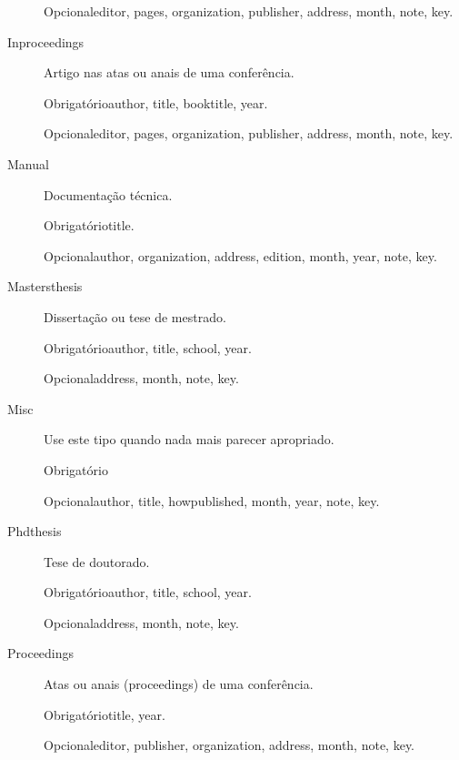 \documentclass[article,openany]{memoir}
\newcommand{\obrigatorios}{%
   \par Obrigatório\dotfill\ignorespaces}
\newcommand{\opcionais}{
   \par Opcional\dotfill\ignorespaces}
\begin{document}
\begin{description}
  \opcionais editor, pages, organization, publisher, address, month, note, key.


\item[Inproceedings]
Artigo nas atas ou anais de uma conferência.

  \obrigatorios author, title, booktitle, year.

  \opcionais editor, pages, organization, publisher, address, month, note, key.


\item[Manual]
Documentação técnica.

  \obrigatorios title.

  \opcionais author, organization, address, edition, month, year, note, key.


\item[Mastersthesis]
Dissertação ou tese de mestrado.

  \obrigatorios author, title, school, year.

  \opcionais address, month, note, key.


\item[Misc]
Use este tipo quando nada mais parecer apropriado.

  \obrigatorios 

  \opcionais author, title, howpublished, month, year, note, key.


\item[Phdthesis]
Tese de doutorado.

  \obrigatorios author, title, school, year.

  \opcionais address, month, note, key.


\item[Proceedings]
Atas ou anais (proceedings) de uma conferência.

  \obrigatorios title, year.

  \opcionais editor, publisher, organization, address, month, note, key.


\end{description}
\end{document}
